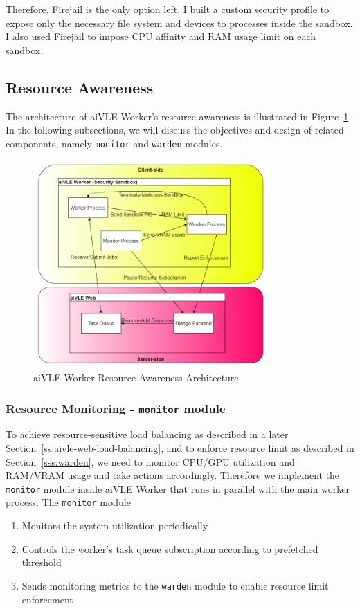 Therefore, Firejail is the only option left. I built a custom security profile to expose only the necessary file system and devices to processes inside the sandbox. I also used Firejail to impose CPU affinity and RAM usage limit on each sandbox.

\subsection{Resource Awareness}
\label{ss:aivle-worker-resource-awareness}
The architecture of aiVLE Worker's resource awareness is illustrated in Figure~\ref{fig:aivle-worker-resource-awareness-arch}. In the following subsections, we will discuss the objectives and design of related components, namely \texttt{monitor} and \texttt{warden} modules.

\begin{figure}[H]
    \centering
    \includegraphics[width=0.8\textwidth]{images/aivle-worker-resource-awareness-arch.png}
    \caption{aiVLE Worker Resource Awareness Architecture}
    \label{fig:aivle-worker-resource-awareness-arch}
\end{figure}

\subsubsection{Resource Monitoring - \texttt{monitor} module}
\label{sss:monitor}
To achieve resource-sensitive load balancing as described in a later Section~\ref{ss:aivle-web-load-balancing}, and to enforce resource limit as described in Section~\ref{sss:warden}, we need to monitor CPU/GPU utilization and RAM/VRAM usage and take actions accordingly. Therefore we implement the \texttt{monitor} module inside aiVLE Worker that runs in parallel with the main worker process. The \texttt{monitor} module
\begin{enumerate}
    \item Monitors the system utilization periodically
    \item Controls the worker's task queue subscription according to prefetched threshold
    \item Sends monitoring metrics to the \texttt{warden} module to enable resource limit enforcement
\end{enumerate}

